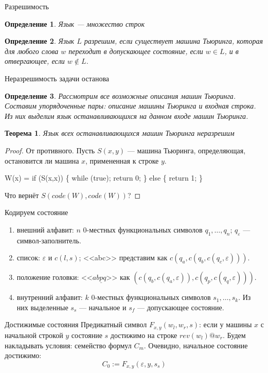 \documentclass[aspectratio=169]{beamer}
\newtheorem{thm}{Теорема}[section]
\newtheorem{dfn}{Определение}[section]
\begin{document}
\begin{frame}{Разрешимость}
\begin{dfn}Язык --- множество строк\end{dfn}
\begin{dfn}Язык $L$ разрешим, если существует машина Тьюринга, которая для любого слова $w$ переходит в допускающее состояние, если $w \in L$,
и в отвергающее, если $w \notin L$.\end{dfn}
\end{frame}

\begin{frame}{Неразрешимость задачи останова}
\begin{dfn}Рассмотрим все возможные описания машин Тьюринга. Составим упорядоченные пары: описание машины Тьюринга и входная строка.
Из них выделим язык останавливающихся на данном входе машин Тьюринга.\end{dfn}
\begin{thm}Язык всех останавливающихся машин Тьюринга неразрешим\end{thm}
\begin{proof}От противного. Пусть $S(x,y)$ --- машина Тьюринга, определяющая, остановится ли машина $x$, примененная к строке $y$.\pause
\begin{center}W(x) = if (S(x,x)) \{ while (true); return 0; \} else \{ return 1; \}\end{center}\pause
Что вернёт $S(code(W),code(W))$?
\end{proof}
\end{frame}

\begin{frame}{Кодируем состояние}
\begin{enumerate}
\item внешний алфавит: $n$ 0-местных функциональных символов $q_1, \dots, q_n$; $q_\varepsilon$ --- символ-заполнитель.
\item список: $\varepsilon$ и $c(l,s)$; <<abc>> представим как $c(q_a,c(q_b,c(q_c,\varepsilon)))$.
\item положение головки: <<$ab\underline{p}q$>> как $(c(q_b,c(q_a,\varepsilon)), c(q_p,c(q_q,\varepsilon)))$.
\item внутренний алфавит: $k$ 0-местных функциональных символов $s_1, \dots, s_k$. Из них выделенные $s_s$ --- начальное и
$s_f$ --- допускающее состояние.
\end{enumerate}
\end{frame}

\begin{frame}{Достижимые состояния}
Предикатный символ $F_{x,y}(w_l,w_r,s)$: если у машины $x$ с начальной строкой $y$ состояние $s$ достижимо на строке $rev(w_l) @ w_r$. 
\pause
Будем накладывать условия: семейство формул $C_m$. \pause
Очевидно, начальное состояние достижимо:
$$C_0 := F_{x,y}(\varepsilon,y,s_s)$$
\end{frame}
\end{document}
